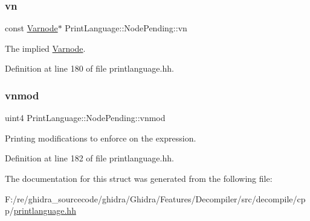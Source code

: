 \subsubsection{\texorpdfstring{vn}{vn}}
{\footnotesize\ttfamily const \mbox{\hyperlink{class_varnode}{Varnode}}$\ast$ Print\+Language\+::\+Node\+Pending\+::vn}



The implied \mbox{\hyperlink{class_varnode}{Varnode}}. 



Definition at line 180 of file printlanguage.\+hh.

\mbox{\label{struct_print_language_1_1_node_pending_aba9c0cf6dcd3d4f86976c8ab0e097839}} 
\subsubsection{\texorpdfstring{vnmod}{vnmod}}
{\footnotesize\ttfamily uint4 Print\+Language\+::\+Node\+Pending\+::vnmod}



Printing modifications to enforce on the expression. 



Definition at line 182 of file printlanguage.\+hh.



The documentation for this struct was generated from the following file\+:\begin{DoxyCompactItemize}
\item 
F\+:/re/ghidra\+\_\+sourcecode/ghidra/\+Ghidra/\+Features/\+Decompiler/src/decompile/cpp/\mbox{\hyperlink{printlanguage_8hh}{printlanguage.\+hh}}\end{DoxyCompactItemize}
